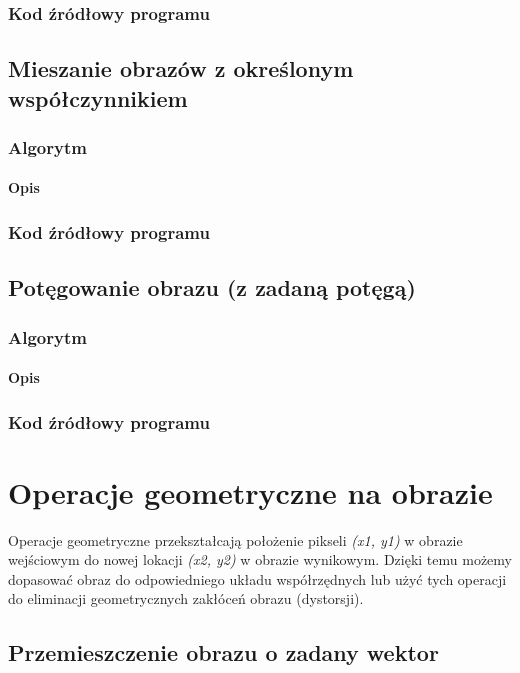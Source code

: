 \documentclass[a4paper,12pt]{book}
\begin{document}
\subsection*{Kod źródłowy programu}

\section{Mieszanie obrazów z określonym współczynnikiem}

\subsection*{Algorytm}
\subsubsection*{Opis}
\subsection*{Kod źródłowy programu}

\section{Potęgowanie obrazu (z zadaną potęgą)}
\subsection*{Algorytm}
\subsubsection*{Opis}
\subsection*{Kod źródłowy programu}

\chapter{Operacje geometryczne na obrazie}
Operacje geometryczne przekształcają położenie pikseli \textit{(x1, y1)} w obrazie wejściowym do nowej lokacji \textit{(x2, y2)} w obrazie wynikowym. Dzięki temu możemy dopasować obraz do odpowiedniego układu współrzędnych lub użyć tych operacji do eliminacji geometrycznych zakłóceń obrazu (dystorsji). 
\section{Przemieszczenie obrazu o zadany wektor}
\end{document}
